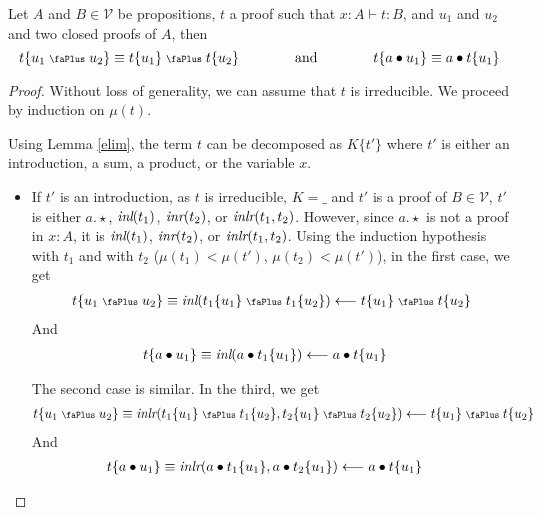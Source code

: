 \documentclass[screen, sigconf,authorversion,nonacm]{acmart}
\theoremstyle{acmdefinition}
\numberwithin{equation}{section}
\newcommand\inl{\mbox{\it inl}}
\newcommand\inr{\mbox{\it inr}}
\newcommand\inlr{\mbox{\it inlr}}
\newcommand\plus{\mathrel{\text{\normalfont\scalebox{0.7}{\faPlus}}}}
\newcommand\lla{\longleftarrow}
\begin{document}
\begin{theorem}[Linearity]
  \label{linearity}
    Let $A$ and $B \in {\mathcal V}$ be propositions, $t$ a proof such that $x:A \vdash t:B$, and $u_1$ and $u_2$ and two closed proofs of $A$, then 
 $$t\{u_1 \plus u_2\} \equiv t\{u_1\} \plus t\{u_2\}
  \qquad\qquad\textrm{and}\qquad\qquad
  t\{a \bullet u_1\} \equiv a \bullet t\{u_1\}$$
\end{theorem}
\begin{proof}
Without loss of generality, we can assume that $t$ is irreducible.
  We proceed by induction on $\mu(t)$. 

  Using Lemma \ref{elim}, the term $t$ can be decomposed as $K\{t'\}$ where $t'$ is either an introduction, a sum, a product, or the variable $x$.

  \begin{itemize}
    \item 
      If $t'$ is an introduction, as $t$ is irreducible, $K = \_$ and
      $t'$ is a proof of $B \in {\mathcal V}$, $t'$ is either
      $a.\star$, $\inl(t_1)$, $\inr(t_2)$, or $\inlr(t_1,t_2)$. However,
      since $a.\star$ is not a proof in $x:A$, it is
      $\inl(t_1)$, $\inr(t_2)$, or $\inlr(t_1,t_2)$. 
      Using the induction hypothesis with $t_1$ and with $t_2$
      ($\mu(t_1) < \mu(t')$, $\mu(t_2) < \mu(t')$),
      in the first case, we get 
      \begin{align*}
	t\{u_1 \plus u_2\}
	\equiv
	\inl(t_1\{u_1\} \plus t_1\{u_2\})
	\lla 
	t\{u_1\} \plus t\{u_2\}
      \end{align*}
      And
      \begin{align*}
	t\{a \bullet u_1\}
	\equiv \inl(a \bullet t_1\{u_1\})
	&
	\lla
	a \bullet t\{u_1\}
      \end{align*}


The second case is similar. In the third,      
      we get
      \begin{align*}
	t\{u_1 \plus u_2\}
	\equiv
	\inlr(t_1\{u_1\} \plus t_1\{u_2\},t_2\{u_1\} \plus t_2\{u_2\})
	\lla 
	t\{u_1\} \plus t\{u_2\}
      \end{align*}
      And
      \begin{align*}
	t\{a \bullet u_1\}
	\equiv \inlr(a \bullet t_1\{u_1\},a \bullet t_2\{u_1\})
	&
	\lla
	a \bullet t\{u_1\}
      \end{align*}



\end{itemize}
\end{proof}
\end{document}
